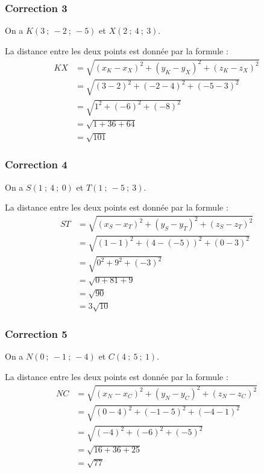 \documentclass[15pt, mathserif]{beamer}
\begin{document}
\begin{frame}
\vspace{-10mm}
	\frametitle{Correction 3}
On a $K(3~;~-2~;~-5)$ et $X(2~;~4~;~3)$.

\medskip

La distance entre les deux points est donnée par la formule : \begin{align*} KX &=\sqrt{(x_K-x_X)^2 + (y_K-y_X)^2 + (z_K-z_X)^2} \\ &= \sqrt{(3-2)^2 + (-2-4)^2 + (-5-3)^2} \\ &= \sqrt{1^2 +\left(-6\right)^2 +\left(-8\right)^2} \\ &= \sqrt{1+36+64} \\ &= \sqrt{101}  \end{align*}\end{frame}


\begin{frame}
\vspace{-10mm}
	\frametitle{Correction 4}
On a $S(1~;~4~;~0)$ et $T(1~;~-5~;~3)$.

\medskip

La distance entre les deux points est donnée par la formule : \begin{align*} ST &=\sqrt{(x_S-x_T)^2 + (y_S-y_T)^2 + (z_S-z_T)^2} \\ &= \sqrt{(1-1)^2 + (4-\left(-5\right))^2 + (0-3)^2} \\ &= \sqrt{0^2 +9^2 +\left(-3\right)^2} \\ &= \sqrt{0+81+9} \\ &= \sqrt{90}  \\ &=3 \sqrt{10} \end{align*}\end{frame}


\begin{frame}
\vspace{-10mm}
	\frametitle{Correction 5}
On a $N(0~;~-1~;~-4)$ et $C(4~;~5~;~1)$.

\medskip

La distance entre les deux points est donnée par la formule : \begin{align*} NC &=\sqrt{(x_N-x_C)^2 + (y_N-y_C)^2 + (z_N-z_C)^2} \\ &= \sqrt{(0-4)^2 + (-1-5)^2 + (-4-1)^2} \\ &= \sqrt{\left(-4\right)^2 +\left(-6\right)^2 +\left(-5\right)^2} \\ &= \sqrt{16+36+25} \\ &= \sqrt{77}  \end{align*}\end{frame}
\end{document}
